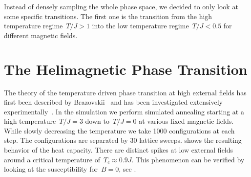 Instead of densely sampling the whole phase space, we decided to only look at
some specific transitions. The first one is the transition from the high
temperature regime~$T/J > 1$ into the low temperature regime~$T/J < 0.5$ for
different magnetic fields.

\section{The Helimagnetic Phase Transition}\label{sec:details}
%
The theory of the temperature driven phase transition at high external fields
has first been described by Brazovskii~\cite{brazovskii} and has been
investigated extensively experimentally~\cite{exp1, exp2, exp3, exp4, exp5,
exp6}. In the simulation we perform simulated annealing starting at a high
temperature~$T/J = 3$ down to~$T/J=0$ at various fixed magnetic fields. While
slowly decreasing the temperature we take 1000 configurations at each step. The
configurations are separated by 30 lattice sweeps.  shows the
resulting behavior of the heat capacity. There are distinct spikes at low
external fields around a critical temperature of~$T_c \approx 0.9 J$. This
phenomenon can be verified by looking at the susceptibility for~$B=0$, see
.

